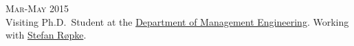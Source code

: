 \begin{paracol}{2}
  \textsc{Mar-May 2015}
\switchcolumn
  \\
  Visiting Ph.D.\ Student at the \href{http://www.man.dtu.dk/english}{Department of Management Engineering}. Working with \href{https://scholar.google.com/citations?user=sYi141QAAAAJ}{Stefan Røpke}.
\end{paracol}

%

%
